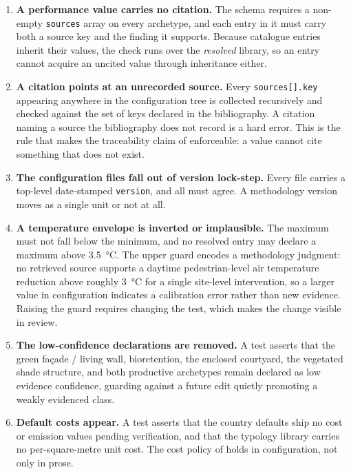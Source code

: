 \begin{enumerate}
  \item \textbf{A performance value carries no citation.} The schema requires a
  non-empty \texttt{sources} array on every archetype, and each entry in it must
  carry both a source key and the finding it supports. Because catalogue entries
  inherit their values, the check runs over the \emph{resolved} library, so an
  entry cannot acquire an uncited value through inheritance either.

  \item \textbf{A citation points at an unrecorded source.} Every
  \texttt{sources[].key} appearing anywhere in the configuration tree is
  collected recursively and checked against the set of keys declared in the
  bibliography. A citation naming a source the bibliography does not record is
  a hard error. This is the rule that makes the traceability claim of
   enforceable: a value cannot cite something that does
  not exist.

  \item \textbf{The configuration files fall out of version lock-step.} Every
  file carries a top-level date-stamped \texttt{version}, and all must agree. A
  methodology version moves as a single unit or not at all.

  \item \textbf{A temperature envelope is inverted or implausible.} The maximum
  must not fall below the minimum, and no resolved entry may declare a maximum above
  \qty{3.5}{\degreeCelsius}. The upper guard encodes a methodology judgment: no
  retrieved source supports a daytime pedestrian-level air temperature
  reduction above roughly \qty{3}{\degreeCelsius} for a single site-level
  intervention, so a larger value in configuration indicates a calibration
  error rather than new evidence. Raising the guard requires changing the test,
  which makes the change visible in review.

  \item \textbf{The low-confidence declarations are removed.} A test asserts
  that the green fa\c{c}ade / living wall, bioretention, the enclosed courtyard,
  the vegetated shade structure, and both productive archetypes remain declared
  as low evidence confidence, guarding against a future edit quietly promoting a
  weakly evidenced class.

  \item \textbf{Default costs appear.} A test asserts that the country defaults
  ship no cost or emission values pending verification, and that the typology
  library carries no per-square-metre unit cost. The cost policy of
   holds in configuration, not only in prose.
\end{enumerate}


